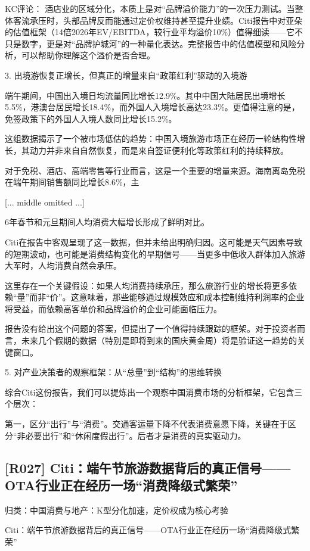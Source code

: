\documentclass[11pt]{ctexart}
\begin{document}
KC评论： 酒店业的区域分化，本质上是对“品牌溢价能力”的一次压力测试。当整体客流承压时，头部品牌反而能通过定价权维持甚至提升业绩。Citi报告中对亚朵的估值框架（14倍2026年EV/EBITDA，较行业平均溢价10\%）值得细读——它不只是数字，更是对“品牌护城河”的一种量化表达。完整报告中的估值模型和风险分析，可以帮助你理解这个溢价是否合理。

3. 出境游恢复正增长，但真正的增量来自“政策红利”驱动的入境游

端午期间，中国出入境日均流量同比增长12.9\%。其中中国大陆居民出境增长5.5\%，港澳台居民增长18.4\%，而外国人入境增长高达23.3\%。更值得注意的是，免签政策下的外国人入境人数同比增长15.2\%。

这组数据揭示了一个被市场低估的趋势：中国入境旅游市场正在经历一轮结构性增长，其动力并非来自自然恢复，而是来自签证便利化等政策红利的持续释放。

对于免税、酒店、高端零售等行业而言，这是一个重要的增量来源。海南离岛免税在端午期间销售额同比增长8.6\%，主

[... middle omitted ...]

6年春节和元旦期间人均消费大幅增长形成了鲜明对比。

Citi在报告中客观呈现了这一数据，但并未给出明确归因。这可能是天气因素导致的短期波动，也可能是消费结构变化的早期信号——当更多中低收入群体加入旅游大军时，人均消费自然会承压。

这里存在一个关键假设：如果人均消费持续承压，那么旅游行业的增长将更多依赖“量”而非“价”。这意味着，那些能够通过规模效应和成本控制维持利润率的企业将受益，而依赖高客单价和品牌溢价的企业可能面临压力。

报告没有给出这个问题的答案，但提出了一个值得持续跟踪的框架。对于投资者而言，未来几个假期的数据（特别是即将到来的国庆黄金周）将是验证这一趋势的关键窗口。

5. 对产业决策者的观察框架：从“总量”到“结构”的思维转换

综合Citi这份报告，我们可以提炼出一个观察中国消费市场的分析框架，它包含三个层次：

第一，区分“出行”与“消费”。交通客运量下降不代表消费意愿下降，关键在于区分“非必要出行”和“休闲度假出行”。后者才是消费的真实驱动力。

\subsection{[R027] Citi：端午节旅游数据背后的真正信号——OTA行业正在经历一场“消费降级式繁荣”}
{\small\color{refgray}归类：中国消费与地产：K型分化加速，定价权成为核心考验}

Citi：端午节旅游数据背后的真正信号——OTA行业正在经历一场“消费降级式繁荣”
\end{document}
